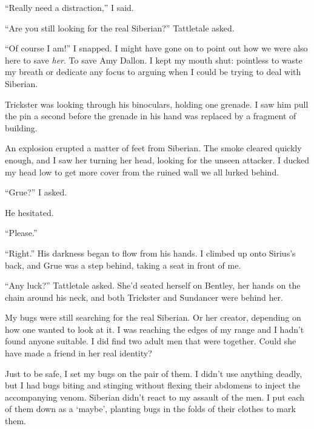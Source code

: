 ``Really need a distraction,'' I said.



``Are you still looking for the real Siberian?''  Tattletale asked.



``Of course I am!''  I snapped.  I might have gone on to point out how we were also here to save \emph{her}.  To save Amy Dallon.  I kept my mouth shut: pointless to waste my breath or dedicate any focus to arguing when I could be trying to deal with Siberian.



Trickster was looking through his binoculars, holding one grenade.  I saw him pull the pin a second before the grenade in his hand was replaced by a fragment of building.



An explosion erupted a matter of feet from Siberian.  The smoke cleared quickly enough, and I saw her turning her head, looking for the unseen attacker.  I ducked my head low to get more cover from the ruined wall we all lurked behind.



``Grue?'' I asked.



He hesitated.



``Please.''



``Right.''  His darkness began to flow from his hands.  I climbed up onto Sirius's back, and Grue was a step behind, taking a seat in front of me.



``Any luck?'' Tattletale asked.  She'd seated herself on Bentley, her hands on the chain around his neck, and both Trickster and Sundancer were behind her.



My bugs were still searching for the real Siberian.  Or her creator, depending on how one wanted to look at it.  I was reaching the edges of my range and I hadn't found anyone suitable.  I did find two adult men that were together.  Could she have made a friend in her real identity?



Just to be safe, I set my bugs on the pair of them.  I didn't use anything deadly, but I had bugs biting and stinging without flexing their abdomens to inject the accompanying venom.  Siberian didn't react to my assault of the men.  I put each of them down as a `maybe', planting bugs in the folds of their clothes to mark them.



